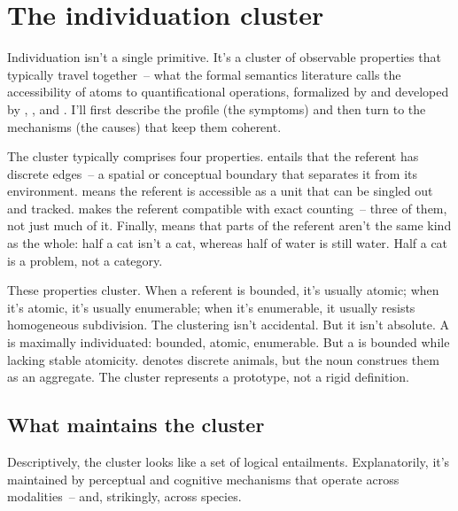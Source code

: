 \section{The individuation cluster}
\label{sec:9:individuation-cluster}

Individuation isn't a single primitive. It's a cluster of observable properties that typically travel together~-- what the formal semantics literature calls the accessibility of atoms to quantificational operations, formalized by \textcite{link1983} and developed by \textcite{chierchia1998}, \textcite{rothstein2010}, and \textcite{grimm2018}. I'll first describe the profile (the symptoms) and then turn to the mechanisms (the causes) that keep them coherent.

The cluster typically comprises four properties.  entails that the referent has discrete edges~-- a spatial or conceptual boundary that separates it from its environment.  means the referent is accessible as a unit that can be singled out and tracked.  makes the referent compatible with exact counting~-- three of them, not just much of it. Finally,  means that parts of the referent aren't the same kind as the whole: half a cat isn't a cat, whereas half of water is still water. Half a cat is a problem, not a category.

These properties cluster. When a referent is bounded, it's usually atomic; when it's atomic, it's usually enumerable; when it's enumerable, it usually resists homogeneous subdivision. The clustering isn't accidental. But it isn't absolute. A  is maximally individuated: bounded, atomic, enumerable. But a  is bounded while lacking stable atomicity.  denotes discrete animals, but the noun construes them as an aggregate. The cluster represents a prototype, not a rigid definition.

\subsection{What maintains the cluster}
\label{sec:9:maintains-cluster}

Descriptively, the cluster looks like a set of logical entailments. Explanatorily, it's maintained by perceptual and cognitive mechanisms that operate across modalities~-- and, strikingly, across species.

